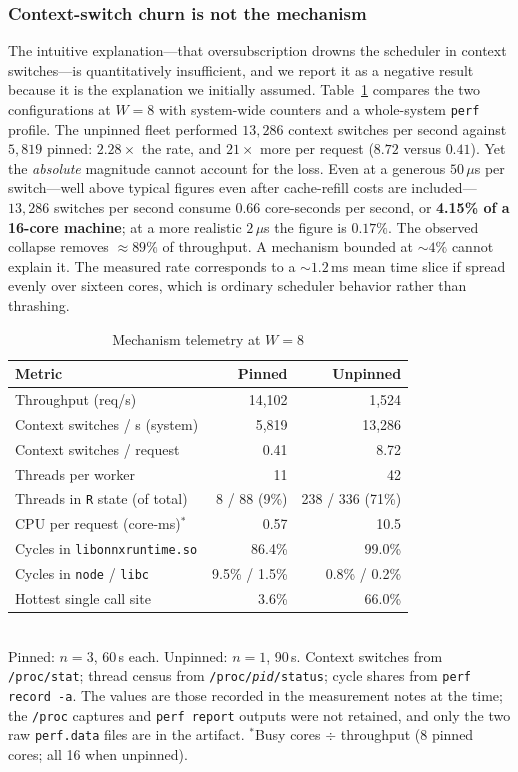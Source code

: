 \documentclass[conference]{IEEEtran}
\begin{document}
\subsubsection{Context-switch churn is not the mechanism}
The intuitive explanation---that oversubscription drowns the scheduler in context switches---is quantitatively insufficient, and we report it as a negative result because it is the explanation we initially assumed. Table~\ref{tab:mech} compares the two configurations at $W{=}8$ with system-wide counters and a whole-system \texttt{perf} profile. The unpinned fleet performed $13{,}286$ context switches per second against $5{,}819$ pinned: $2.28\times$ the rate, and $21\times$ more per request ($8.72$ versus $0.41$). Yet the \emph{absolute} magnitude cannot account for the loss. Even at a generous $50\,\mu$s per switch---well above typical figures even after cache-refill costs are included---$13{,}286$ switches per second consume $0.66$ core-seconds per second, or \textbf{4.15\% of a 16-core machine}; at a more realistic $2\,\mu$s the figure is $0.17\%$. The observed collapse removes ${\approx}89\%$ of throughput. A mechanism bounded at ${\sim}4\%$ cannot explain it. The measured rate corresponds to a ${\sim}1.2$\,ms mean time slice if spread evenly over sixteen cores, which is ordinary scheduler behavior rather than thrashing.

\begin{table}[t]
\caption{Mechanism telemetry at $W{=}8$}
\label{tab:mech}
\centering\small\setlength{\tabcolsep}{3pt}
\begin{tabular}{@{}lrr@{}}
\toprule
Metric & Pinned & Unpinned \\
\midrule
Throughput (req/s) & 14{,}102 & 1{,}524 \\
Context switches / s (system) & 5{,}819 & 13{,}286 \\
Context switches / request & 0.41 & 8.72 \\
Threads per worker & 11 & 42 \\
Threads in \texttt{R} state (of total) & 8 / 88 (9\%) & 238 / 336 (71\%) \\
CPU per request (core-ms)$^{\ast}$ & 0.57 & 10.5 \\
Cycles in \texttt{libonnxruntime.so} & 86.4\% & 99.0\% \\
Cycles in \texttt{node} / \texttt{libc} & 9.5\% / 1.5\% & 0.8\% / 0.2\% \\
Hottest single call site & 3.6\% & 66.0\% \\
\bottomrule
\end{tabular}
\\[2pt]\footnotesize Pinned: $n{=}3$, 60\,s each. Unpinned: $n{=}1$, 90\,s. Context switches from \texttt{/proc/stat}; thread census from \texttt{/proc/\textit{pid}/status}; cycle shares from \texttt{perf record -a}. The values are those recorded in the measurement notes at the time; the \texttt{/proc} captures and \texttt{perf report} outputs were not retained, and only the two raw \texttt{perf.data} files are in the artifact. $^{\ast}$Busy cores $\div$ throughput (8 pinned cores; all 16 when unpinned).
\end{table}
\end{document}
